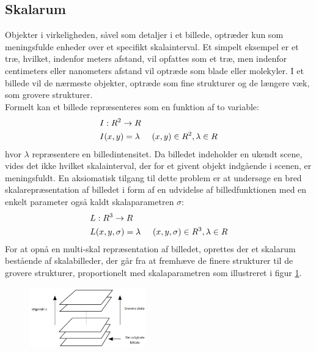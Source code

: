 \subsection{Skalarum}
Objekter i virkeligheden, såvel som detaljer i et billede, optræder kun som meningsfulde enheder over et specifikt skalainterval. Et simpelt eksempel er et træ, hvilket, indenfor meters afstand, vil opfattes som et træ, men indenfor centimeters eller nanometers afstand vil optræde som blade eller molekyler. I et billede vil de nærmeste objekter, optræde som fine strukturer og de længere væk, som grovere strukturer. 
\\
Formelt kan et billede repræsenteres som en funktion af to variable:
\begin{equation}
\begin{split}
&I: R^2 \rightarrow R \\
&I(x,y) = \lambda \hspace{0.5 cm} (x,y)\in R^2, \lambda \in R
\end{split}
\end{equation}
hvor $\lambda$ repræsentere en billedintensitet. Da billedet indeholder en ukendt scene, vides det ikke hvilket skalainterval, der for et givent objekt indgående i scenen, er meningsfuldt. En aksiomatisk tilgang til dette problem er at undersøge en bred skalarepræsentation af billedet i form af en udvidelse af billedfunktionen med en enkelt parameter også kaldt skalaparametren $\sigma$:
\begin{equation}
\begin{split}
&L: R^3 \rightarrow R \\
&L(x,y,\sigma) = \lambda \hspace{0.5 cm} (x,y,\sigma)\in R^3, \lambda \in R
\end{split}
\end{equation}
For at opnå en multi-skal repræsentation af billedet, oprettes der et skalarum bestående af skalabilleder, der går fra at fremhæve de finere strukturer til de grovere strukturer, proportionelt med skalaparametren som illustreret i figur \ref{fig:scalerep}. 
\begin{figure}[H]
    \centering
    \includegraphics[width=0.45\textwidth]{fig/32.png}
     \vspace{-1em}
    \begin{center}    
       \caption{\textcolor{gray}{\footnotesize \textit{ }}}
    \label{fig:scalerep}
     \end{center}
     \vspace{-2.5em}
  \end{figure} \noindent

